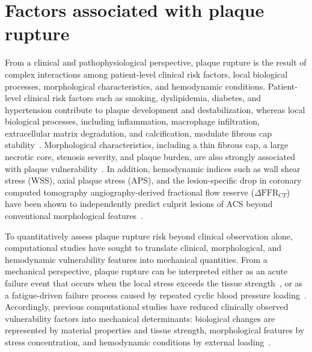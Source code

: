 \documentclass[master,english,final]{kaist-ucs}
\begin{document}
\section{Factors associated with plaque rupture}
From a clinical and pathophysiological perspective, plaque rupture is the result of complex interactions among patient-level clinical risk factors, local biological processes, morphological characteristics, and hemodynamic conditions. Patient-level clinical risk factors such as smoking, dyslipidemia, diabetes, and hypertension contribute to plaque development and destabilization, whereas local biological processes, including inflammation, macrophage infiltration, extracellular matrix degradation, and calcification, modulate fibrous cap stability~\cite{naghavi2003vulnerable, finn2010vulnerable, bentzon2014}. Morphological characteristics, including a thin fibrous cap, a large necrotic core, stenosis severity, and plaque burden, are also strongly associated with plaque vulnerability~\cite{bentzon2014, virmani2006}. In addition, hemodynamic indices such as wall shear stress (WSS), axial plaque stress (APS), and the lesion-specific drop in coronary computed tomography angiography-derived fractional flow reserve ($\Delta \mathrm{FFR}_{CT}$) have been shown to independently predict culprit lesions of ACS beyond conventional morphological features~\cite{lee2019emerald, yang2021}.

To quantitatively assess plaque rupture risk beyond clinical observation alone, computational studies have sought to translate clinical, morphological, and hemodynamic vulnerability features into mechanical quantities. From a mechanical perspective, plaque rupture can be interpreted either as an acute failure event that occurs when the local stress exceeds the tissue strength~\cite{choi2015aps, brown2016, gu2022}, or as a fatigue-driven failure process caused by repeated cyclic blood pressure loading~\cite{bank2000, versluis2006}. Accordingly, previous computational studies have reduced clinically observed vulnerability factors into mechanical determinants: biological changes are represented by material properties and tissue strength, morphological features by stress concentration, and hemodynamic conditions by external loading~\cite{brown2016, gu2022, corti2022}.
\end{document}
